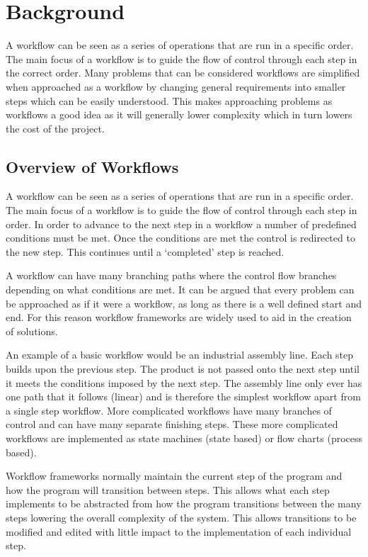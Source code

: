 \chapter{Background}

A workflow can be seen as a series of operations that are run in a specific order. The main focus of a workflow is to guide the flow of control through each step in the correct order. Many problems that can be considered workflows are simplified when approached as a workflow by changing general requirements into smaller steps which can be easily understood. This makes approaching problems as workflows a good idea as it will generally lower complexity which in turn lowers the cost of the project.


\section{Overview of Workflows}

A workflow can be seen as a series of operations that are run in a specific order. The main focus of a workflow is to guide the flow of control through each step in order. In order to advance to the next step in a workflow a number of predefined conditions must be met. Once the conditions are met the control is redirected to the new step. This continues until a ‘completed’ step is reached.

A workflow can have many branching paths where the control flow branches depending on what conditions are met. It can be argued that every problem can be approached as if it were a workflow, as long as there is a well defined start and end. For this reason workflow frameworks are widely used to aid in the creation of solutions.

An example of a basic workflow would be an industrial assembly line. Each step builds upon the previous step. The product is not passed onto the next step until it meets the conditions imposed by the next step. The assembly line only ever has one path that it follows (linear) and is therefore the simplest workflow apart from a single step workflow. More complicated workflows have many branches of control and can have many separate finishing steps. These more complicated workflows are implemented as state machines (state based) or flow charts (process based).

Workflow frameworks normally maintain the current step of the program and how the program will transition between steps. This allows what each step implements to be abstracted from how the program transitions between the many steps lowering the overall complexity of the system. This allows transitions to be modified and edited with little impact to the implementation of each individual step.

